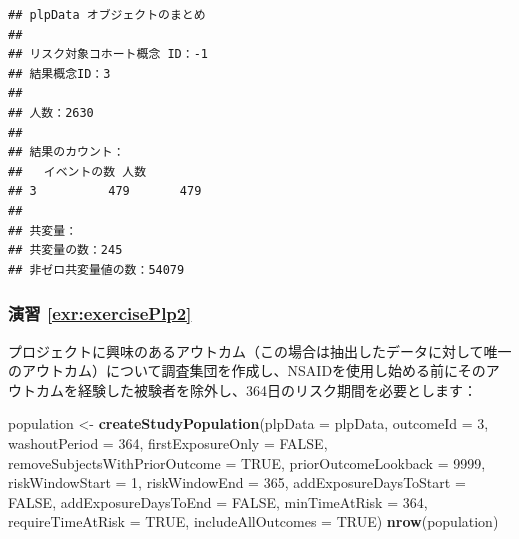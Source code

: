 \documentclass[
  11pt]{book}
\newenvironment{Shaded}{\begin{snugshade}}{\end{snugshade}}
\newcommand{\AttributeTok}[1]{\textcolor[rgb]{0.13,0.29,0.53}{#1}}
\newcommand{\ConstantTok}[1]{\textcolor[rgb]{0.56,0.35,0.01}{#1}}
\newcommand{\DecValTok}[1]{\textcolor[rgb]{0.00,0.00,0.81}{#1}}
\newcommand{\FunctionTok}[1]{\textcolor[rgb]{0.13,0.29,0.53}{\textbf{#1}}}
\newcommand{\NormalTok}[1]{#1}
\newcommand{\OtherTok}[1]{\textcolor[rgb]{0.56,0.35,0.01}{#1}}
\theoremstyle{definition}
\theoremstyle{definition}
\theoremstyle{definition}
\theoremstyle{definition}
\theoremstyle{remark}
\begin{document}
\begin{verbatim}
## plpData オブジェクトのまとめ
## 
## リスク対象コホート概念 ID：-1
## 結果概念ID：3
## 
## 人数：2630
## 
## 結果のカウント：
##   イベントの数 人数
## 3          479       479
## 
## 共変量：
## 共変量の数：245
## 非ゼロ共変量値の数：54079
\end{verbatim}

\subsubsection*{演習 \ref{exr:exercisePlp2}}\label{ux6f14ux7fd2-refexrexerciseplp2}

プロジェクトに興味のあるアウトカム（この場合は抽出したデータに対して唯一のアウトカム）について調査集団を作成し、NSAIDを使用し始める前にそのアウトカムを経験した被験者を除外し、364日のリスク期間を必要とします：

\begin{Shaded}
\begin{Highlighting}[]
\NormalTok{population }\OtherTok{\textless{}{-}} \FunctionTok{createStudyPopulation}\NormalTok{(}\AttributeTok{plpData =}\NormalTok{ plpData,}
                                    \AttributeTok{outcomeId =} \DecValTok{3}\NormalTok{,}
                                    \AttributeTok{washoutPeriod =} \DecValTok{364}\NormalTok{,}
                                    \AttributeTok{firstExposureOnly =} \ConstantTok{FALSE}\NormalTok{,}
                                    \AttributeTok{removeSubjectsWithPriorOutcome =} \ConstantTok{TRUE}\NormalTok{,}
                                    \AttributeTok{priorOutcomeLookback =} \DecValTok{9999}\NormalTok{,}
                                    \AttributeTok{riskWindowStart =} \DecValTok{1}\NormalTok{,}
                                    \AttributeTok{riskWindowEnd =} \DecValTok{365}\NormalTok{,}
                                    \AttributeTok{addExposureDaysToStart =} \ConstantTok{FALSE}\NormalTok{,}
                                    \AttributeTok{addExposureDaysToEnd =} \ConstantTok{FALSE}\NormalTok{,}
                                    \AttributeTok{minTimeAtRisk =} \DecValTok{364}\NormalTok{,}
                                    \AttributeTok{requireTimeAtRisk =} \ConstantTok{TRUE}\NormalTok{,}
                                    \AttributeTok{includeAllOutcomes =} \ConstantTok{TRUE}\NormalTok{)}
\FunctionTok{nrow}\NormalTok{(population)}
\end{Highlighting}
\end{Shaded}
\end{document}
